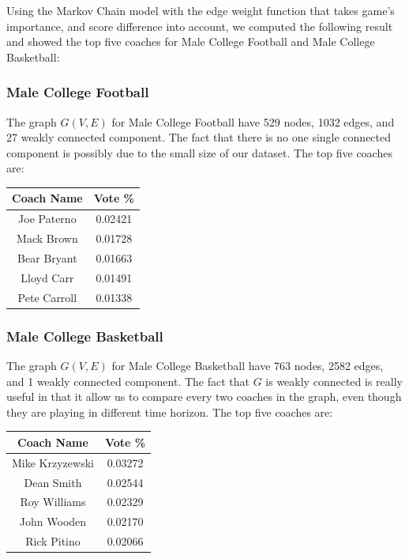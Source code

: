 \documentclass[titlepage]{article}
\begin{document}
Using the Markov Chain model with the edge weight function that takes game's importance, and score difference into account, we computed the following result and showed the top five coaches for Male College Football and Male College Basketball:

\subsubsection*{Male College Football}

\noindent The graph $G(V, E)$ for Male College Football have 529 nodes, 1032 edges, and 27 weakly connected component. The fact that there is no one single connected component is possibly due to the small size of our dataset. The top five coaches are:

\begin{center}
\begin{tabular}{ | c | c | }
\hline
Coach Name   & Vote \% \\\hline
Joe Paterno  & 0.02421 \\\hline
Mack Brown   & 0.01728 \\\hline
Bear Bryant  & 0.01663 \\\hline
Lloyd Carr   & 0.01491 \\\hline
Pete Carroll & 0.01338 \\
\hline
\end{tabular}
\end{center}

\subsubsection*{Male College Basketball}

\noindent The graph $G(V, E)$ for Male College Basketball have 763 nodes, 2582 edges, and 1 weakly connected component. The fact that $G$ is weakly connected is really useful in that it allow us to compare every two coaches in the graph, even though they are playing in different time horizon. The top five coaches are:

\begin{center}
\begin{tabular}{ | c | c | }
\hline
Coach Name  & Vote \% \\\hline
Mike Krzyzewski & 0.03272 \\\hline
Dean Smith  & 0.02544 \\\hline
Roy Williams & 0.02329 \\\hline
John Wooden  & 0.02170 \\\hline
Rick Pitino  & 0.02066 \\
\hline
\end{tabular}
\end{center}
\end{document}
